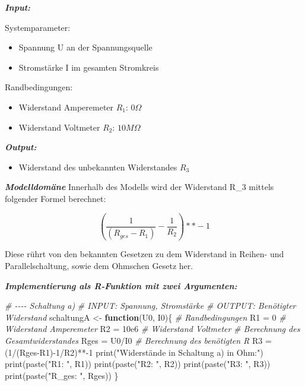 \documentclass[
  9pt,
]{article}
\newenvironment{Shaded}{\begin{snugshade}}{\end{snugshade}}
\newcommand{\CommentTok}[1]{\textcolor[rgb]{0.56,0.35,0.01}{\textit{#1}}}
\newcommand{\ControlFlowTok}[1]{\textcolor[rgb]{0.13,0.29,0.53}{\textbf{#1}}}
\newcommand{\DecValTok}[1]{\textcolor[rgb]{0.00,0.00,0.81}{#1}}
\newcommand{\FloatTok}[1]{\textcolor[rgb]{0.00,0.00,0.81}{#1}}
\newcommand{\FunctionTok}[1]{\textcolor[rgb]{0.00,0.00,0.00}{#1}}
\newcommand{\NormalTok}[1]{#1}
\newcommand{\OtherTok}[1]{\textcolor[rgb]{0.56,0.35,0.01}{#1}}
\newcommand{\SpecialCharTok}[1]{\textcolor[rgb]{0.00,0.00,0.00}{#1}}
\newcommand{\StringTok}[1]{\textcolor[rgb]{0.31,0.60,0.02}{#1}}
\providecommand{\tightlist}{%
  \setlength{\itemsep}{0pt}\setlength{\parskip}{0pt}}
\begin{document}
\textbf{\emph{Input:}}

Systemparameter:

\begin{itemize}
\tightlist
\item
  Spannung U an der Spannungsquelle
\item
  Stromstärke I im gesamten Stromkreis
\end{itemize}

Randbedingungen:

\begin{itemize}
\tightlist
\item
  Widerstand Amperemeter \(R_1\): \(0\Omega\)
\item
  Widerstand Voltmeter \(R_2\): \(10M\Omega\)
\end{itemize}

\textbf{\emph{Output:}}

\begin{itemize}
\tightlist
\item
  Widerstand des unbekannten Widerstandes \(R_3\)
\end{itemize}

\textbf{\emph{Modelldomäne}} Innerhalb des Modells wird der Widerstand
R\_3 mittels folgender Formel berechnet:

\[(\frac{1}{(R_{ges}-R_1)}-\frac{1}{R_2})**-1\]

Diese rührt von den bekannten Gesetzen zu dem Widerstand in Reihen- und
Parallelschaltung, sowie dem Ohmschen Gesetz her.

\textbf{\emph{Implementierung als R-Funktion mit zwei Argumenten:}}

\begin{Shaded}
\begin{Highlighting}[]
\CommentTok{\# {-}{-}{-}{-} Schaltung a)}
\CommentTok{\# INPUT: Spannung, Stromstärke}
\CommentTok{\# OUTPUT: Benötigter Widerstand}
\NormalTok{schaltungA }\OtherTok{\textless{}{-}} \ControlFlowTok{function}\NormalTok{(U0, I0)\{}
  \CommentTok{\# Randbedingungen}
\NormalTok{  R1 }\OtherTok{=} \DecValTok{0} \CommentTok{\# Widerstand Amperemeter}
\NormalTok{  R2 }\OtherTok{=} \FloatTok{10e6} \CommentTok{\# Widerstand Voltmeter}
  \CommentTok{\# Berechnung des Gesamtwiderstandes}
\NormalTok{  Rges }\OtherTok{=}\NormalTok{ U0}\SpecialCharTok{/}\NormalTok{I0}
  \CommentTok{\# Berechnung des benötigten R}
\NormalTok{  R3 }\OtherTok{=}\NormalTok{ (}\DecValTok{1}\SpecialCharTok{/}\NormalTok{(Rges}\SpecialCharTok{{-}}\NormalTok{R1)}\SpecialCharTok{{-}}\DecValTok{1}\SpecialCharTok{/}\NormalTok{R2)}\SpecialCharTok{**{-}}\DecValTok{1}
  \FunctionTok{print}\NormalTok{(}\StringTok{"Widerstände in Schaltung a) in Ohm:"}\NormalTok{)}
  \FunctionTok{print}\NormalTok{(}\FunctionTok{paste}\NormalTok{(}\StringTok{"R1: "}\NormalTok{, R1))}
  \FunctionTok{print}\NormalTok{(}\FunctionTok{paste}\NormalTok{(}\StringTok{"R2: "}\NormalTok{, R2))}
  \FunctionTok{print}\NormalTok{(}\FunctionTok{paste}\NormalTok{(}\StringTok{"R3: "}\NormalTok{, R3))}
  \FunctionTok{print}\NormalTok{(}\FunctionTok{paste}\NormalTok{(}\StringTok{"R\_ges: "}\NormalTok{, Rges))}
\NormalTok{\}}
\end{Highlighting}
\end{Shaded}
\end{document}
